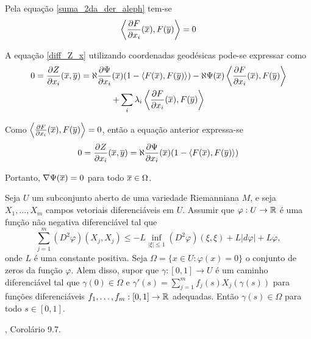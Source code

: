 \begin{demonstracao}
	Pela equação \eqref{suma_2da_der_aleph} tem-se
	\begin{equation*}
		\left\langle \frac{\partial F}{\partial x_i}(\overline{x}), F(\overline{y}) \right\rangle = 0
	\end{equation*}
	
	A equação \eqref{diff_Z_x} utilizando coordenadas geodésicas pode-se expressar como
	\begin{multline*}
		0 = \frac{\partial Z}{\partial x_i}(\overline{x},\overline{y}) = \aleph \frac{\partial \Psi}{\partial x_i}(\overline{x})(1 - \langle F(\overline{x}),F(\overline{y}) \rangle)  - \aleph \Psi(\overline{x}) \left\langle \frac{\partial F}{\partial x_i}(\overline{x}), F(\overline{y}) \right\rangle\\
		+ \sum_i \lambda_i \left\langle \frac{\partial F}{\partial x_i}(\overline{x}),F(\overline{y}) \right\rangle
	\end{multline*}
	
	Como $\left\langle \frac{\partial F}{\partial x_i}(\overline{x}),F(\overline{y}) \right\rangle = 0$, então a equação anterior expressa-se
	\begin{equation*}
		0 = \frac{\partial Z}{\partial x_i}(\overline{x},\overline{y}) = \aleph \frac{\partial \Psi}{\partial x_i}(\overline{x})(1 - \langle F(\overline{x}),F(\overline{y}) \rangle)
	\end{equation*}
	
	Portanto, $\nabla \Psi(\overline{x}) = 0$ para todo $\overline{x} \in \Omega$.
\end{demonstracao}

\begin{lema}\label{bony}
	Seja $U$ um subconjunto aberto de uma variedade Riemanniana $M$, e seja $X_1, \ldots, X_m$ campos vetoriais diferenciáveis em $U$. Assumir que $\varphi: U \rightarrow \mathbb{R}$ é uma função não negativa diferenciável tal que
	\begin{equation*}
		\sum_{j=1}^{m} (D^2 \varphi)(X_j,X_j) \leq -L \inf_{|\xi| \leq 1} (D^2 \varphi)(\xi,\xi) + L |d \varphi| + L \varphi,
	\end{equation*}
	onde $L$ é uma constante positiva. Seja $\Omega = \{ x \in U: \varphi(x) = 0 \}$ o conjunto de zeros da função $\varphi$. Alem disso, supor que $\gamma: [0,1] \rightarrow U$ é um caminho diferenciável tal que $\gamma(0) \in \Omega$ e $\gamma'(s) = \sum_{j=1}^{m} f_j(s) X_j(\gamma(s))$ para funções diferenciáveis $f_1, \ldots, f_m: [0,1] \rightarrow \mathbb{R}$ adequadas. Então $\gamma(s) \in \Omega$ para todo $s \in [0,1]$.
\end{lema}

\begin{demonstracao}
	\cite{Brendle2010}, Corolário 9.7.
\end{demonstracao}

